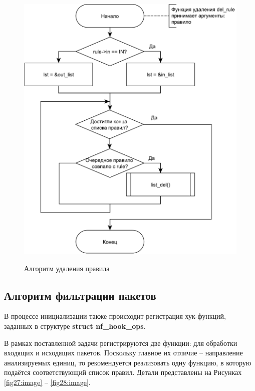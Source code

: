\begin{figure}[h!]
	\begin{center}
		{\includegraphics[scale = 0.55]{img/del_rule.pdf}}
		\caption{Алгоритм удаления правила}
		\label{fig26:image}
	\end{center}
\end{figure}

\pagebreak

\subsection{Алгоритм фильтрации пакетов}\label{sec:filter}
В процессе инициализации также происходит регистрация хук-функций, заданных в структуре \textbf{struct nf\_hook\_ops}. 

В рамках поставленной задачи регистрируются две функции: для обработки входящих и исходящих пакетов. Поскольку главное их отличие -- направление анализируемых единиц, то рекомендуется реализовать одну функцию, в которую подаётся соответствующий список правил. Детали представлены на Рисунках \ref{fig27:image} -- \ref{fig28:image}.

